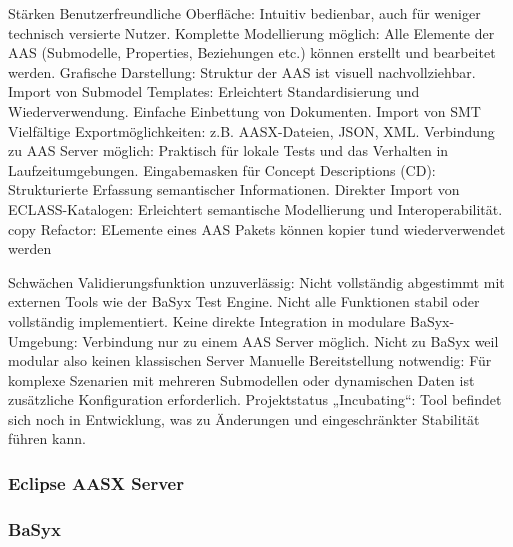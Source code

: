 Stärken
Benutzerfreundliche Oberfläche: Intuitiv bedienbar, auch für weniger technisch versierte Nutzer.
Komplette Modellierung möglich: Alle Elemente der AAS (Submodelle, Properties, Beziehungen etc.) können erstellt und bearbeitet werden.
Grafische Darstellung: Struktur der AAS ist visuell nachvollziehbar.
Import von Submodel Templates: Erleichtert Standardisierung und Wiederverwendung.
Einfache Einbettung von Dokumenten.
Import von SMT
Vielfältige Exportmöglichkeiten: z.B. AASX-Dateien, JSON, XML.
Verbindung zu AAS Server möglich: Praktisch für lokale Tests und das Verhalten in Laufzeitumgebungen.
Eingabemasken für Concept Descriptions (CD): Strukturierte Erfassung semantischer Informationen.
Direkter Import von ECLASS-Katalogen: Erleichtert semantische Modellierung und Interoperabilität.
copy Refactor: ELemente eines AAS Pakets können kopier tund wiederverwendet werden


Schwächen
Validierungsfunktion unzuverlässig: Nicht vollständig abgestimmt mit externen Tools wie der BaSyx Test Engine.
Nicht alle Funktionen stabil oder vollständig implementiert.
Keine direkte Integration in modulare BaSyx-Umgebung: Verbindung nur zu einem AAS Server möglich. Nicht zu BaSyx weil modular also keinen klassischen Server
Manuelle Bereitstellung notwendig: Für komplexe Szenarien mit mehreren Submodellen oder dynamischen Daten ist zusätzliche Konfiguration erforderlich.
Projektstatus „Incubating“: Tool befindet sich noch in Entwicklung, was zu Änderungen und eingeschränkter Stabilität führen kann.

\subsubsection{Eclipse AASX Server}
\subsubsection{BaSyx}